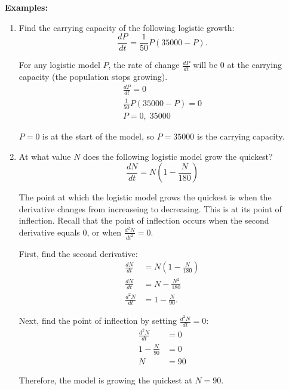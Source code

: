 \noindent \textbf{Examples:}
\begin{enumerate}
	\item Find the carrying capacity of the following logistic growth:
	\[ \frac{dP}{dt} = \frac{1}{50} P (35000 - P). \]

	For any logistic model $P$, the rate of change $\frac{dP}{dt}$ will be $0$ at the carrying capacity (the population stops growing).
	\begin{gather*}
		\frac{dP}{dt} = 0 \\[5pt]
		\frac{1}{50} P (35000 - P) = 0 \\[5pt]
		P = 0, \; 35000
	\end{gather*}

	$P = 0$ is at the start of the model, so $P = 35000$ is the carrying capacity.

	\item At what value $N$ does the following logistic model grow the quickest?
	\[ \frac{dN}{dt} = N \left( 1 - \frac{N}{180} \right) \]

	The point at which the logistic model grows the quickest is when the derivative changes from increaseing to decreasing. This is at its point of inflection. Recall that the point of inflection occurs when the second derivative equals $0$, or when $\frac{d^2 N}{dt^2} = 0$.

	First, find the second derivative:
	\begin{align*}
		\frac{dN}{dt} &= N \left( 1 - \frac{N}{180} \right) \\[5pt]
		\frac{dN}{dt} &= N - \frac{N^2}{180} \\[5pt]
		\frac{d^2 N}{dt} &= 1 - \frac{N}{90}.
	\end{align*}

	Next, find the point of inflection by setting $\frac{d^2 N}{dt} = 0$:
	\begin{align*}
		\frac{d^2 N}{dt} &= 0 \\[5pt]
		1 - \frac{N}{90} &= 0 \\[5pt]
		N &= 90
	\end{align*}

	Therefore, the model is growing the quickest at $N = 90$.
\end{enumerate}
